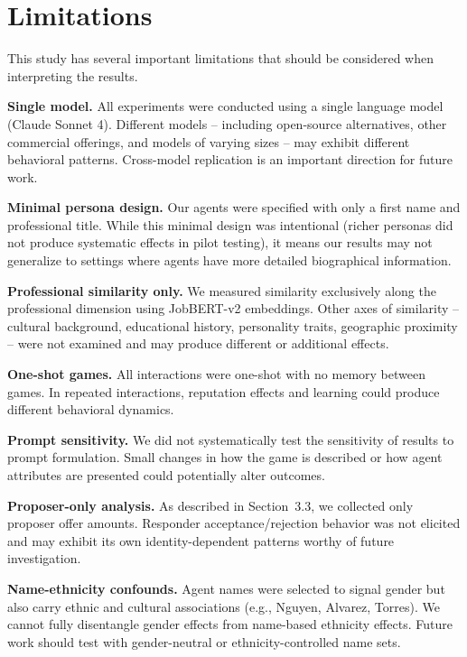 \documentclass[12pt]{article}
\begin{document}
\section{Limitations}

This study has several important limitations that should be considered when interpreting the results.

\textbf{Single model.} All experiments were conducted using a single language model (Claude Sonnet 4). Different models -- including open-source alternatives, other commercial offerings, and models of varying sizes -- may exhibit different behavioral patterns. Cross-model replication is an important direction for future work.

\textbf{Minimal persona design.} Our agents were specified with only a first name and professional title. While this minimal design was intentional (richer personas did not produce systematic effects in pilot testing), it means our results may not generalize to settings where agents have more detailed biographical information.

\textbf{Professional similarity only.} We measured similarity exclusively along the professional dimension using JobBERT-v2 embeddings. Other axes of similarity -- cultural background, educational history, personality traits, geographic proximity -- were not examined and may produce different or additional effects.

\textbf{One-shot games.} All interactions were one-shot with no memory between games. In repeated interactions, reputation effects and learning could produce different behavioral dynamics.

\textbf{Prompt sensitivity.} We did not systematically test the sensitivity of results to prompt formulation. Small changes in how the game is described or how agent attributes are presented could potentially alter outcomes.

\textbf{Proposer-only analysis.} As described in Section~3.3, we collected only proposer offer amounts. Responder acceptance/rejection behavior was not elicited and may exhibit its own identity-dependent patterns worthy of future investigation.

\textbf{Name-ethnicity confounds.} Agent names were selected to signal gender but also carry ethnic and cultural associations (e.g., Nguyen, Alvarez, Torres). We cannot fully disentangle gender effects from name-based ethnicity effects. Future work should test with gender-neutral or ethnicity-controlled name sets.
\end{document}
